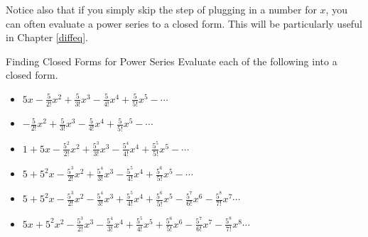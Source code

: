 Notice also that if you simply skip the step of plugging in a number for $x$, you can often evaluate a power series to a closed form.  This will be particularly useful in Chapter \ref{diffeq}.

\begin{exercise}{Finding Closed Forms for Power Series \Coffeecup \Coffeecup \Coffeecup}
Evaluate each of the following into a closed form.
\begin{itemize}

\item $5x-\frac{5}{2!}x^2+\frac{5}{3!}x^3-\frac{5}{4!}x^4+\frac{5}{5!}x^5-\cdots$

\vspace*{2in}

\item $-\frac{5}{2!}x^2+\frac{5}{3!}x^3-\frac{5}{4!}x^4+\frac{5}{5!}x^5-\cdots$

\vspace*{2in}

\item  $1+5x-\frac{5^2}{2!}x^2+\frac{5^3}{3!}x^3-\frac{5^4}{4!}x^4+\frac{5^5}{5!}x^5-\cdots$

\vspace*{2in}

\item  $5+5^2x-\frac{5^3}{2!}x^2+\frac{5^4}{3!}x^3-\frac{5^5}{4!}x^4+\frac{5^6}{5!}x^5-\cdots$

\vspace*{2in}

\item  $5+5^2x-\frac{5^3}{2!}x^2-\frac{5^4}{3!}x^3+\frac{5^5}{4!}x^4+\frac{5^6}{5!}x^5-\frac{5^7}{6!}x^6-\frac{5^8}{7!}x^7\cdots$

\vspace*{2in}

\item  $5x+5^2x^2-\frac{5^3}{2!}x^3-\frac{5^4}{3!}x^4+\frac{5^5}{4!}x^5+\frac{5^6}{5!}x^6-\frac{5^7}{6!}x^7-\frac{5^8}{7!}x^8\cdots$

\vspace*{2in}
\end{itemize}
\end{exercise}

